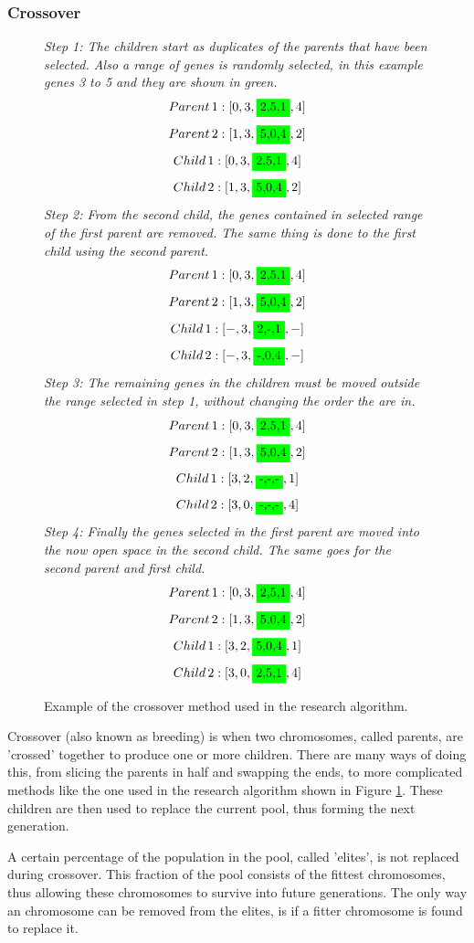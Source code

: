 \subsubsection{Crossover}\label{crossover}
\par
\begin{figure}[H]
\textit{Step 1: The children start as duplicates of the parents that have been selected. Also a range of genes is randomly selected, in this example genes 3 to 5 and they are shown in green.}
\[Parent\, 1: [0,3,\colorbox{green}{2,5,1},4]\]
\[Parent\, 2: [1,3,\colorbox{green}{5,0,4},2]\]
\[Child\, 1: [0,3,\colorbox{green}{2,5,1},4]\]
\[Child\, 2: [1,3,\colorbox{green}{5,0,4},2]\]
\textit{Step 2: From the second child, the genes contained in selected range of the first parent are removed. The same thing is done to the first child using the second parent.}
\[Parent\, 1: [0,3,\colorbox{green}{2,5,1},4]\]
\[Parent\, 2: [1,3,\colorbox{green}{5,0,4},2]\]
\[Child\, 1: [-,3,\colorbox{green}{2,-,1},-]\]
\[Child\, 2: [-,3,\colorbox{green}{-,0,4},-]\]
\textit{Step 3: The remaining genes in the children must be moved outside the range selected in step 1, without changing the order the are in.}
\[Parent\, 1: [0,3,\colorbox{green}{2,5,1},4]\]
\[Parent\, 2: [1,3,\colorbox{green}{5,0,4},2]\]
\[Child\, 1: [3,2,\colorbox{green}{-,-,-},1]\]
\[Child\, 2: [3,0,\colorbox{green}{-,-,-},4]\]
\textit{Step 4: Finally the genes selected in the first parent are moved into the now open space in the second child. The same goes for the second parent and first child.}
\[Parent\, 1: [0,3,\colorbox{green}{2,5,1},4]\]
\[Parent\, 2: [1,3,\colorbox{green}{5,0,4},2]\]
\[Child\, 1: [3,2,\colorbox{green}{5,0,4},1]\]
\[Child\, 2: [3,0,\colorbox{green}{2,5,1},4]\]
\caption{Example of the crossover method used in the research algorithm. \label{fig:cross}}
\end{figure}
Crossover (also known as breeding) is when two chromosomes, called parents, are 'crossed' together to produce one or more children. There are many ways of doing this, from slicing the parents in half and swapping the ends, to more complicated methods like the one used in the research algorithm shown in Figure \ref{fig:cross}. These children are then used to replace the current pool, thus forming the next generation.
\par
A certain percentage of the population in the pool, called 'elites', is not replaced during crossover. This fraction of the pool consists of the fittest chromosomes, thus allowing these chromosomes to survive into future generations. The only way an chromosome can be removed from the elites, is if a fitter chromosome is found to replace it.
